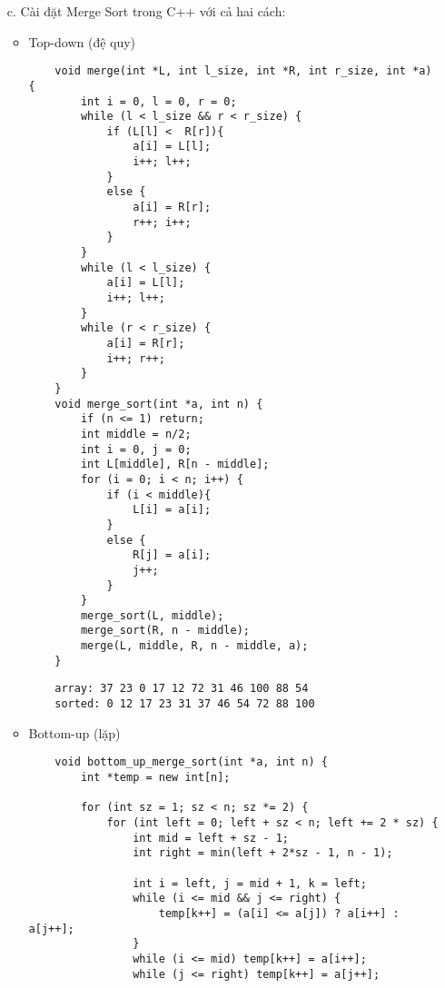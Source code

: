 \documentclass[12pt,a4paper]{article}
\begin{document}
\begin{enumerate}
    \newpage
    \item[c.] Cài đặt Merge Sort trong C++ với cả hai cách:
    \begin{itemize}
    \item Top-down (đệ quy)
    \begin{verbatim}
    void merge(int *L, int l_size, int *R, int r_size, int *a) {
        int i = 0, l = 0, r = 0;
        while (l < l_size && r < r_size) {
            if (L[l] <  R[r]){
                a[i] = L[l];
                i++; l++;
            }
            else {
                a[i] = R[r];
                r++; i++;
            }
        } 
        while (l < l_size) {
            a[i] = L[l];
            i++; l++;
        }
        while (r < r_size) {
            a[i] = R[r];
            i++; r++;
        }
    }
    void merge_sort(int *a, int n) {
        if (n <= 1) return;
        int middle = n/2;
        int i = 0, j = 0;
        int L[middle], R[n - middle];
        for (i = 0; i < n; i++) {
            if (i < middle){
                L[i] = a[i];
            }
            else {
                R[j] = a[i];
                j++;
            }
        }
        merge_sort(L, middle);
        merge_sort(R, n - middle);
        merge(L, middle, R, n - middle, a);
    }
    \end{verbatim}

    \begin{verbatim}
    array: 37 23 0 17 12 72 31 46 100 88 54
    sorted: 0 12 17 23 31 37 46 54 72 88 100
    \end{verbatim}

    \item Bottom-up (lặp)
    \begin{verbatim}
    void bottom_up_merge_sort(int *a, int n) {
        int *temp = new int[n];
        
        for (int sz = 1; sz < n; sz *= 2) {
            for (int left = 0; left + sz < n; left += 2 * sz) {
                int mid = left + sz - 1;
                int right = min(left + 2*sz - 1, n - 1);
                
                int i = left, j = mid + 1, k = left;
                while (i <= mid && j <= right) {
                    temp[k++] = (a[i] <= a[j]) ? a[i++] : a[j++];
                }
                while (i <= mid) temp[k++] = a[i++];
                while (j <= right) temp[k++] = a[j++];
                

\end{verbatim}
\end{itemize}
\end{enumerate}
\end{document}
